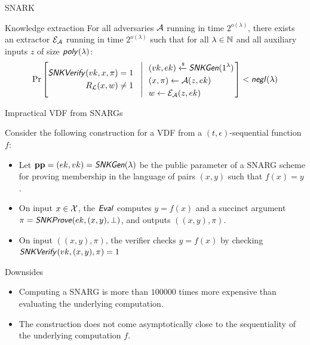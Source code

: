 \documentclass[UTF8]{beamer}
\begin{document}
	\begin{frame}{SNARK}
		\begin{block}{Knowledge extraction}
			For all adversaries $\mathcal{A}$ running in time $2^{o(\lambda)}$, there exists an extractor $\mathcal{E}_{\mathcal{A}}$ running in time $2^{o(\lambda)}$ such that for all $\lambda\in\mathbb{N}$ and all auxiliary inputs $z$ of size $\textsf{\textit{poly}}(\lambda)$:
			\begin{equation*}
				\Pr\left[
				\begin{aligned}
					\textsf{\textit{SNKVerify}}(vk,x,\pi)=1\\
					R_{\mathcal{L}}(x,w)\neq1
				\end{aligned}
				~~\left|~~
				\begin{aligned}
					&(vk,ek)\xleftarrow{\text{\tiny$\mathsf{\$}$}}\textsf{\textit{SNKGen}}(1^\lambda)\\
					&(x,\pi)\gets\mathcal{A}(z,ek)\\
					&w\gets\mathcal{E}_{\mathcal{A}}(z,ek)
				\end{aligned}
				\right.\right]<\textsf{\textit{negl}}(\lambda)
			\end{equation*}
		\end{block}
	\end{frame}
	\begin{frame}{Impractical VDF from SNARGs}
		\begin{block}{}
			Consider the following construction for a VDF from a $(t,\epsilon)$-sequential function $f$:
			\begin{itemize}
				\item Let $\mathbf{pp}=(ek,vk)=\textsf{\textit{SNKGen}}(\lambda)$ be the public parameter of a SNARG scheme for proving membership in the language of pairs $(x,y)$ such that $f(x)=y$.
				\item On input $x\in\mathcal{X}$, the $\textsf{\textit{Eval}}$ computes $y=f(x)$ and a succinct argument $\pi=\textsf{\textit{SNKProve}}(ek,(x,y),\bot)$, and outputs $((x,y),\pi)$.
				\item On input $((x,y),\pi)$, the verifier checks $y=f(x)$ by checking $\textsf{\textit{SNKVerify}}(vk,(x,y),\pi)=1$
			\end{itemize}
		\end{block}
		\begin{block}{Downsides}
			\begin{itemize}
				\item Computing a SNARG is more than $100000$ times more expensive than evaluating the underlying computation.
				\item The construction does not come asymptotically close to the sequentiality of the underlying computation $f$.
			\end{itemize}
		\end{block}
	\end{frame}
\end{document}
